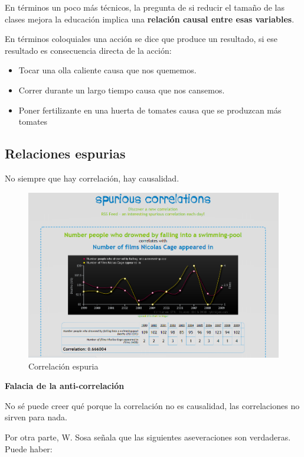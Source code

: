 \documentclass[
]{book}
\providecommand{\tightlist}{%
  \setlength{\itemsep}{0pt}\setlength{\parskip}{0pt}}
\begin{document}
En términos un poco más técnicos, la pregunta de si reducir el tamaño de las clases mejora la educación implica una \textbf{relación causal entre esas variables}.

En términos coloquiales una acción se dice que produce un resultado, si ese resultado es consecuencia directa de la acción:

\begin{itemize}
\tightlist
\item
  Tocar una olla caliente causa que nos quememos.
\item
  Correr durante un largo tiempo causa que nos cansemos.
\item
  Poner fertilizante en una huerta de tomates causa que se produzcan más tomates
\end{itemize}

\hypertarget{relaciones-espurias}{%
\subsection{Relaciones espurias}\label{relaciones-espurias}}

No siempre que hay correlación, hay causalidad.

\begin{figure}

{\centering \includegraphics[width=0.8\linewidth]{imagenes/Spurious} 

}

\caption{Correlación espuria}\label{fig:unnamed-chunk-2}
\end{figure}

\textbf{Falacia de la anti-correlación}

No sé puede creer qué porque la correlación no es causalidad, las correlaciones no sirven para nada.

Por otra parte, W. Sosa señala que las siguientes aseveraciones son verdaderas. Puede haber:
\end{document}
